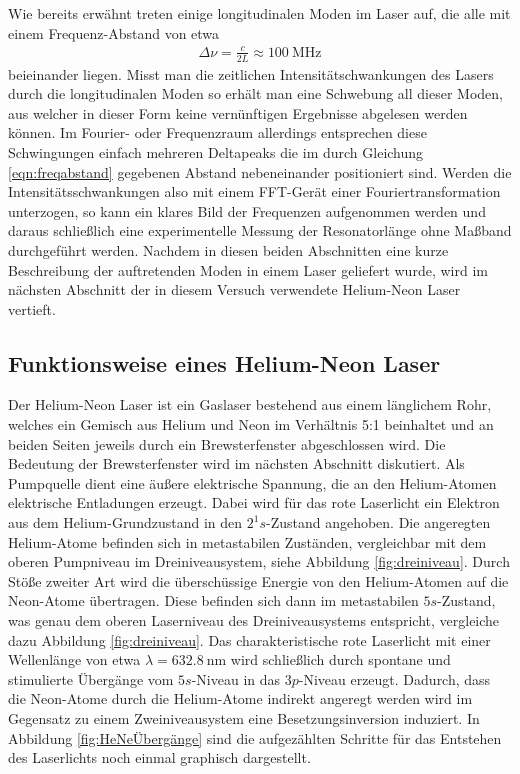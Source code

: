 Wie bereits erwähnt treten einige longitudinalen Moden im Laser auf, die alle mit einem Frequenz-Abstand von etwa
\begin{align}
  \Delta \nu = \frac{c}{2 L} \approx \SI{100}{\mega\hertz}
  \label{eqn:freqabstand}
\end{align}
beieinander liegen. Misst man die zeitlichen Intensitätschwankungen des Lasers durch die longitudinalen Moden
so erhält man eine Schwebung all dieser Moden, aus welcher in dieser Form keine vernünftigen Ergebnisse
abgelesen werden können. Im Fourier- oder Frequenzraum allerdings entsprechen diese Schwingungen einfach
mehreren Deltapeaks die im durch Gleichung \eqref{eqn:freqabstand} gegebenen Abstand nebeneinander positioniert sind.
Werden die Intensitätsschwankungen also mit einem FFT-Gerät einer Fouriertransformation unterzogen, so kann
ein klares Bild der Frequenzen aufgenommen werden und daraus schließlich eine experimentelle Messung der
Resonatorlänge ohne Maßband durchgeführt werden.
Nachdem in diesen beiden Abschnitten eine kurze Beschreibung der auftretenden Moden in einem Laser geliefert wurde,
wird im nächsten Abschnitt der in diesem Versuch verwendete Helium-Neon Laser vertieft.

\subsection{Funktionsweise eines Helium-Neon Laser}

Der Helium-Neon Laser ist ein Gaslaser bestehend aus einem länglichem Rohr, welches ein Gemisch aus Helium und Neon
im Verhältnis 5:1 beinhaltet und an beiden Seiten jeweils durch ein Brewsterfenster abgeschlossen wird.
Die Bedeutung der Brewsterfenster wird im nächsten Abschnitt diskutiert. Als Pumpquelle dient eine äußere
elektrische Spannung, die an den Helium-Atomen elektrische Entladungen erzeugt. Dabei wird für das rote
Laserlicht ein Elektron aus dem Helium-Grundzustand in den $2^1 s$-Zustand angehoben. Die angeregten Helium-Atome
befinden sich in metastabilen Zuständen, vergleichbar mit dem oberen Pumpniveau im Dreiniveausystem, siehe Abbildung
\ref{fig:dreiniveau}. Durch Stöße zweiter Art wird die überschüssige Energie von den Helium-Atomen auf die
Neon-Atome übertragen. Diese befinden sich dann im metastabilen $5s$-Zustand, was genau dem oberen
Laserniveau des Dreiniveausystems entspricht, vergleiche dazu Abbildung \ref{fig:dreiniveau}.
Das charakteristische rote Laserlicht mit einer Wellenlänge von etwa $\lambda = \SI{632,8}{\nano\meter}$
wird schließlich durch spontane und stimulierte Übergänge vom $5s$-Niveau in das $3p$-Niveau erzeugt.
Dadurch, dass die Neon-Atome durch die Helium-Atome indirekt angeregt werden wird im Gegensatz zu einem
Zweiniveausystem eine Besetzungsinversion induziert. In Abbildung \ref{fig:HeNeÜbergänge} sind die
aufgezählten Schritte für das Entstehen des Laserlichts noch einmal graphisch dargestellt.


